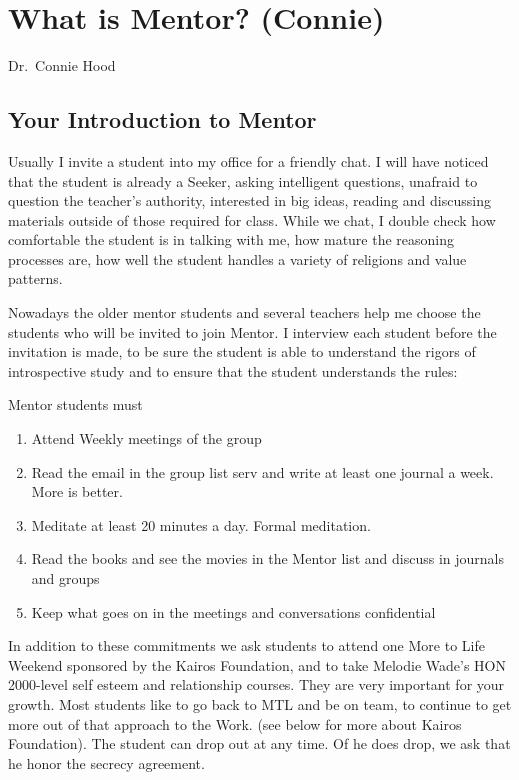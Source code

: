 \chapter{What is Mentor? (Connie)}

\begin{authors}
	Dr.\ Connie Hood
\end{authors}

\vspace{0.5cm}

\section{Your Introduction to Mentor}

Usually I invite a student into my office for a friendly chat. I will
have noticed that the student is already a Seeker, asking intelligent
questions, unafraid to question the teacher's authority, interested in
big ideas, reading and discussing materials outside of those required
for class. While we chat, I double check how comfortable the student
is in talking with me, how mature the reasoning processes are, how
well the student handles a variety of religions and value patterns.

Nowadays the older mentor students and several teachers help me choose
the students who will be invited to join Mentor. I interview each
student before the invitation is made, to be sure the student is able
to understand the rigors of introspective study and to ensure that the
student understands the rules:

Mentor students must
\begin{enumerate}
	\item Attend Weekly meetings of the group
	\item Read the email in the group list serv and write at least one
journal a week. More is better.
	\item Meditate at least 20 minutes a day. Formal meditation.
	\item Read the books and see the movies in the Mentor list and discuss in
journals and groups
	\item Keep what goes on in the meetings and conversations confidential
\end{enumerate}

In addition to these commitments we ask students to attend one More to
Life Weekend sponsored by the Kairos Foundation, and to take Melodie
Wade's HON 2000-level self esteem and relationship courses. They are
very important for your growth. Most students like to go back to MTL
and be on team, to continue to get more out of that approach to the
Work. (see below for more about Kairos Foundation). The student can
drop out at any time. Of he does drop, we ask that he honor the
secrecy agreement.

